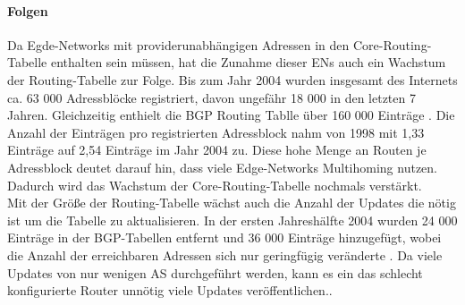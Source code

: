 \paragraph{Folgen}
Da Egde-Networks mit providerunabhängigen Adressen in den Core-Routing-Tabelle enthalten sein müssen, hat die Zunahme dieser ENs auch ein Wachstum der Routing-Tabelle zur Folge. Bis zum Jahr 2004 wurden insgesamt des Internets ca. 63 000 Adressblöcke registriert, davon ungefähr 18 000 in den letzten 7 Jahren. Gleichzeitig enthielt die BGP Routing Tablle über 160 000 Einträge \cite{journals/ccr/MengXZHLZ04}.  Die Anzahl der Einträgen pro registrierten Adressblock nahm von 1998 mit 1,33 Einträge auf 2,54 Einträge im Jahr 2004 zu. Diese hohe Menge an Routen je Adressblock deutet darauf hin, dass viele Edge-Networks Multihoming nutzen. Dadurch wird das Wachstum der Core-Routing-Tabelle nochmals verstärkt.\\
Mit der Größe der Routing-Tabelle wächst auch die Anzahl der Updates die nötig ist um die Tabelle zu aktualisieren. In der ersten Jahreshälfte 2004 wurden 24 000 Einträge in der BGP-Tabellen entfernt und 36 000 Einträge hinzugefügt, wobei die Anzahl der erreichbaren Adressen sich nur geringfügig veränderte \cite{journals/ccr/MengXZHLZ04}. Da viele Updates von nur wenigen AS durchgeführt werden, kann es ein das schlecht konfigurierte Router unnötig viele Updates veröffentlichen.\cite{jen:2008:start}. \\

 


